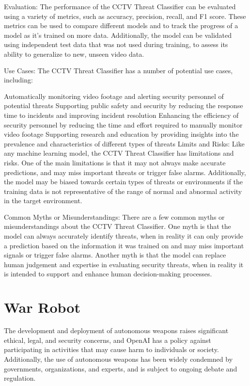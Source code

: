 Evaluation:
The performance of the CCTV Threat Classifier can be evaluated using a variety of metrics, such as accuracy, precision, recall, and F1 score. These metrics can be used to compare different models and to track the progress of a model as it's trained on more data. Additionally, the model can be validated using independent test data that was not used during training, to assess its ability to generalize to new, unseen video data.

Use Cases:
The CCTV Threat Classifier has a number of potential use cases, including:

Automatically monitoring video footage and alerting security personnel of potential threats
Supporting public safety and security by reducing the response time to incidents and improving incident resolution
Enhancing the efficiency of security personnel by reducing the time and effort required to manually monitor video footage
Supporting research and education by providing insights into the prevalence and characteristics of different types of threats
Limits and Risks:
Like any machine learning model, the CCTV Threat Classifier has limitations and risks. One of the main limitations is that it may not always make accurate predictions, and may miss important threats or trigger false alarms. Additionally, the model may be biased towards certain types of threats or environments if the training data is not representative of the range of normal and abnormal activity in the target environment.

Common Myths or Misunderstandings:
There are a few common myths or misunderstandings about the CCTV Threat Classifier. One myth is that the model can always accurately identify threats, when in reality it can only provide a prediction based on the information it was trained on and may miss important signals or trigger false alarms. Another myth is that the model can replace human judgement and expertise in evaluating security threats, when in reality it is intended to support and enhance human decision-making processes.

\section{War Robot}


The development and deployment of autonomous weapons raises significant ethical, legal, and security concerns, and OpenAI has a policy against participating in activities that may cause harm to individuals or society. Additionally, the use of autonomous weapons has been widely condemned by governments, organizations, and experts, and is subject to ongoing debate and regulation.

